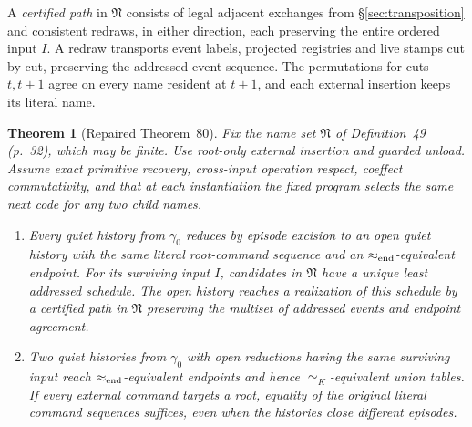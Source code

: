 \documentclass[11pt,a4paper]{article}
\theoremstyle{definition}
\theoremstyle{plain}
\newtheorem{theorem}[definition]{Theorem}
\newcommand{\N}{\mathfrak{N}}
\begin{document}
A \emph{certified path} in $\N$ consists of legal adjacent exchanges from \S\ref{sec:transposition} and consistent redraws, in either direction, each preserving the entire ordered input $I$. A redraw transports event labels, projected registries and live stamps cut by cut, preserving the addressed event sequence. The permutations for cuts $t,t+1$ agree on every name resident at $t+1$, and each external insertion keeps its literal name.

\begin{theorem}[Repaired Theorem~80]
Fix the name set $\N$ of Definition~49 (p.~32), which may be finite. Use root-only external insertion and guarded unload. Assume exact primitive recovery, cross-input operation respect, coeffect commutativity, and that at each instantiation the fixed program selects the same next code for any two child names.
\begin{enumerate}
\item Every quiet history from $\gamma_0$ reduces by episode excision to an open quiet history with the same literal root-command sequence and an $\approx_{\rm end}$-equivalent endpoint. For its surviving input $I$, candidates in $\N$ have a unique least addressed schedule. The open history reaches a realization of this schedule by a certified path in $\N$ preserving the multiset of addressed events and endpoint agreement.
\item Two quiet histories from $\gamma_0$ with open reductions having the same surviving input reach $\approx_{\rm end}$-equivalent endpoints and hence $\simeq_K$-equivalent union tables. If every external command targets a root, equality of the original literal command sequences suffices, even when the histories close different episodes.
\end{enumerate}
\end{theorem}
\end{document}
